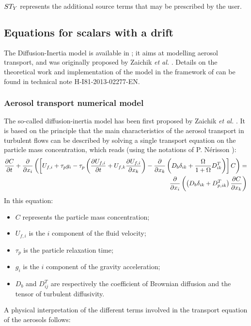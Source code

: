 $ST_Y$ represents the additional source terms that may be prescribed by the
user.

\subsection{Equations for scalars with a drift}
The Diffusion-Inertia model is available in \CS; it aims at modelling aerosol transport, and
was originally proposed by Zaichik \emph{et al.} \cite{Zaichik:2004}.
Details on the theoretical work and implementation of the model in the framework
of \CS can be found in technical note H-I81-2013-02277-EN.

\subsubsection{Aerosol transport numerical model}
%
The so-called diffusion-inertia model has been first proposed by Zaichik \emph{et al.}
\cite{Zaichik:2004}. It is based on the principle that the main characteristics
of the aerosol transport in turbulent flows can be described by solving a single
transport equation on the particle mass concentration, which reads (using the
notations of P. N\'erisson \cite{Nerisson:2009}):
\begin{eqnarray}\label{eq:goveqn:transport}
  \dfrac{\partial C}{\partial t} + \dfrac{\partial }{\partial x_i}\left(\left[U_{f,i} + \tau_pg_i
    - \tau_p \left(\dfrac{\partial U_{f,i}}{\partial t}+U_{f,k}\dfrac{\partial U_{f,i}}{\partial x_k}\right)
    - \dfrac{\partial }{\partial x_k}\left(D_b\delta_{ik}+\dfrac{\Omega}{1+\Omega}D^T_{ik}\right)\right]C\right)=\\
    \dfrac{\partial }{\partial x_i}\left(\left(D_b\delta_{ik}+D^T_{p,ik}\right)\dfrac{\partial C}{\partial x_k}\right)\nonumber
\end{eqnarray}
In this equation:
\begin{itemize}
 \item $C$ represents the particle mass concentration;
 \item $U_{f,i}$ is the $i$ component of the fluid velocity;
 \item $\tau_p$ is the particle relaxation time;
 \item $g_i$ is the $i$ component of the gravity acceleration;
 \item $D_b$ and $D^T_{ij}$ are respectively the coefficient of Brownian
   diffusion and the tensor of turbulent diffusivity.
\end{itemize}
A physical interpretation of the different terms involved in the transport
equation of the aerosols follows:
